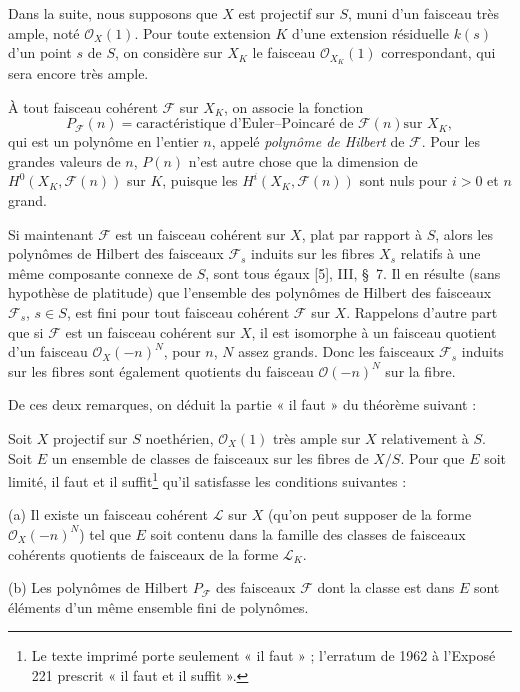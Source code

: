 
Dans la suite, nous supposons que $X$ est projectif sur $S$, muni d'un faisceau
très ample, noté $\mathcal O_X(1)$. Pour toute extension $K$ d'une extension
résiduelle $k(s)$ d'un point $s$ de $S$, on considère sur $X_K$ le faisceau
$\mathcal O_{X_K}(1)$ correspondant, qui sera encore très ample.

À tout faisceau cohérent $\mathcal F$ sur $X_K$, on associe la fonction
\[
P_{\mathcal F}(n)=\text{caractéristique d'Euler--Poincaré de $\mathcal F(n)$
sur $X_K$},
\]
qui est un polynôme en l'entier $n$, appelé \emph{polynôme de Hilbert} de
$\mathcal F$. Pour les grandes valeurs de $n$, $P(n)$ n'est autre chose que la
dimension de $H^0(X_K,\mathcal F(n))$ sur $K$, puisque les
$H^i(X_K,\mathcal F(n))$ sont nuls pour $i>0$ et $n$ grand.

Si maintenant $\mathcal F$ est un faisceau cohérent sur $X$, plat par rapport
à $S$, alors les polynômes de Hilbert des faisceaux $\mathcal F_s$ induits sur
les fibres $X_s$ relatifs à une même composante connexe de $S$, sont tous égaux
[5], III, \S~7. Il en résulte (sans hypothèse de platitude) que l'ensemble des
polynômes de Hilbert des faisceaux $\mathcal F_s$, $s\in S$, est fini pour tout
faisceau cohérent $\mathcal F$ sur $X$.
Rappelons d'autre part que si $\mathcal F$ est un faisceau cohérent sur $X$, il
est isomorphe à un faisceau quotient d'un faisceau $\mathcal O_X(-n)^N$, pour
$n$, $N$ assez grands. Donc les faisceaux $\mathcal F_s$ induits sur les fibres
sont également quotients du faisceau $\mathcal O(-n)^N$ sur la fibre.

De ces deux remarques, on déduit la partie « il faut » du théorème suivant :

 Soit $X$ projectif sur $S$ noethérien,
$\mathcal O_X(1)$ très ample sur $X$ relativement à $S$. Soit $E$ un ensemble
de classes de faisceaux sur les fibres de $X/S$. Pour que $E$ soit limité, il
faut et il suffit\footnote{Le texte imprimé porte seulement « il faut » ;
l'erratum de 1962 à l'Exposé 221 prescrit « il faut et il suffit ».} qu'il
satisfasse les conditions suivantes :

\medskip
\noindent (a) Il existe un faisceau cohérent $\mathcal L$ sur $X$ (qu'on peut
supposer de la forme $\mathcal O_X(-n)^N$) tel que $E$ soit contenu dans la
famille des classes de faisceaux cohérents quotients de faisceaux de la forme
$\mathcal L_K$.

\smallskip
\noindent (b) Les polynômes de Hilbert $P_{\mathcal F}$ des faisceaux
$\mathcal F$ dont la classe est dans $E$ sont éléments d'un même ensemble fini
de polynômes.

